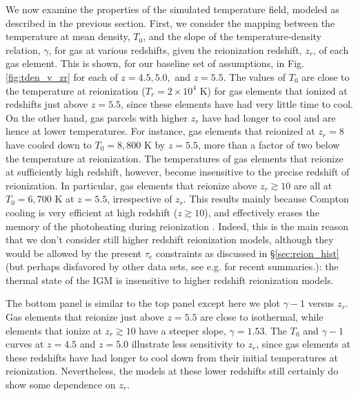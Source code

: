 We now examine the properties of the simulated temperature field, modeled as described in the previous section. 
First, we consider the mapping between the temperature at mean density, $T_0$, and the slope of the temperature-density
relation, $\gamma$, for gas at various redshifts, given the reionization redshift, $z_r$, of each gas element. This
is shown, for our baseline set of assumptions, in Fig. \ref{fig:tden_v_zr} for each of $z=4.5,5.0,$ and $z=5.5$.
The values of $T_0$ are close to the temperature at reionization ($T_r = 2 \times 10^4$ K) for gas elements that ionized at redshifts
just above $z=5.5$, since these elements have had very little time to cool. On the other hand, gas parcels with higher $z_r$ have had longer to cool
and are hence at lower temperatures. For instance, gas elements that reionized at $z_r = 8$ have cooled down to $T_0 = 8,800$ K by
$z = 5.5$, more than a factor of two below the temperature at reionization. The temperatures of gas elements that reionize at sufficiently
high redshift, however, become insensitive to the precise redshift of reionization. In particular, gas elements that
reionize above $z_r \gtrsim 10$ are all at $T_0 = 6,700$ K at $z=5.5$, irrespective of $z_r$. This results mainly
because Compton cooling is very efficient at high redshift ($z \gtrsim 10$), and effectively erases the 
memory of the photoheating during
reionization \citep{Hui:1997dp}. Indeed, this is the main reason that we don't consider still higher redshift reionization
models, although they would be allowed by the present $\tau_e$ constraints as discussed in \S \ref{sec:reion_hist} (but perhaps disfavored by other data sets, see e.g. \citealt{Robertson:2013bq,Kuhlen:2012vy} for recent summaries.): 
the thermal state of the IGM is insensitive to higher redshift reionization models.

The bottom panel is similar to the top panel
except here we plot $\gamma-1$ versus $z_r$. Gas elements that reionize just above $z = 5.5$ are close to isothermal, while
elements that ionize at $z_r \gtrsim 10$ have a steeper slope, $\gamma = 1.53$. The $T_0$ and $\gamma-1$ curves at $z=4.5$ and $z=5.0$ illustrate
less sensitivity to $z_r$, since gas elements at these redshifts have had longer to cool down from their initial
temperatures at reionization. Nevertheless, the models at these lower redshifts still certainly do show some 
dependence on $z_r$. 

